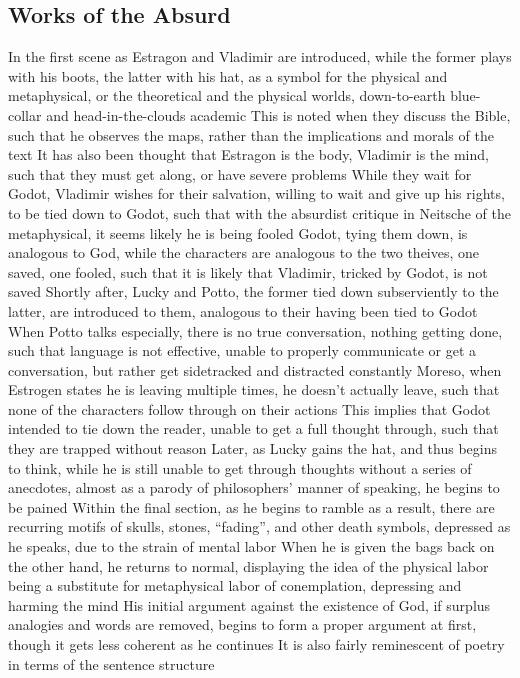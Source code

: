\documentclass[11 pt, twoside]{article}
\newenvironment{outline*}
{
	\begin{outline}[enumerate]
	}
	{\end{outline}
}
\begin{document}
\subsection{Works of the Absurd}
\begin{outline*}
\1 In the first scene as Estragon and Vladimir are introduced, while the former plays with his boots, the latter with his hat, as a symbol for the physical and metaphysical, or the theoretical and the physical worlds, down-to-earth blue-collar and head-in-the-clouds academic
\2 This is noted when they discuss the Bible, such that he observes the maps, rather than the implications and morals of the text
\2 It has also been thought that Estragon is the body, Vladimir is the mind, such that they must get along, or have severe problems
\1 While they wait for Godot, Vladimir wishes for their salvation, willing to wait and give up his rights, to be tied down to Godot, such that with the absurdist critique in Neitsche of the metaphysical, it seems likely he is being fooled
\2 Godot, tying them down, is analogous to God, while the characters are analogous to the two theives, one saved, one fooled, such that it is likely that Vladimir, tricked by Godot, is not saved
\2 Shortly after, Lucky and Potto, the former tied down subserviently to the latter, are introduced to them, analogous to their having been tied to Godot
\1 When Potto talks especially, there is no true conversation, nothing getting done, such that language is not effective, unable to properly communicate or get a conversation, but rather get sidetracked and distracted constantly
\2 Moreso, when Estrogen states he is leaving multiple times, he doesn't actually leave, such that none of the characters follow through on their actions
\2 This implies that Godot intended to tie down the reader, unable to get a full thought through, such that they are trapped without reason
\1 Later, as Lucky gains the hat, and thus begins to think, while he is still unable to get through thoughts without a series of anecdotes, almost as a parody of philosophers' manner of speaking, he begins to be pained
\2 Within the final section, as he begins to ramble as a result, there are recurring motifs of skulls, stones, ``fading'', and other death symbols, depressed as he speaks, due to the strain of mental labor
\3 When he is given the bags back on the other hand, he returns to normal, displaying the idea of the physical labor being a substitute for metaphysical labor of conemplation, depressing and harming the mind
\2 His initial argument against the existence of God, if surplus analogies and words are removed, begins to form a proper argument at first, though it gets less coherent as he continues
\2 It is also fairly reminescent of poetry in terms of the sentence structure
\end{outline*}
\end{document}
